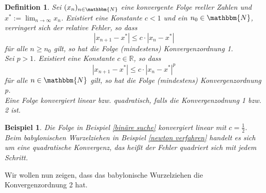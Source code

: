 \documentclass[12pt]{article}
\newcommand{\N}{\mathbbm{N}} %
\newcommand{\R}{\mathbb{R}} %
\newtheorem{definition}[satz]{Definition}
\newtheorem{beispiel}[satz]{Beispiel}
\begin{document}
\begin{definition}
    Sei $(x_n)_{n \in \N}$ eine konvergente Folge reeller Zahlen und $x^*:= \lim_{n \to \infty}x_n$. Existiert eine Konstante $c<1$ und ein $n_0 \in \N$, verringert sich der relative Fehler, so dass 
    \begin{equation*}
        |x_{n+1}-x^*| \leq c \cdot |x_n -x^*|
    \end{equation*}
    für alle $n \geq n_0$ gilt, so hat die Folge (mindestens) Konvergenzordnung 1. \\
    Sei $p>1$. Existiert eine Konstante $c \in \R$, so dass
    \begin{equation*}
        |x_{n+1}-x^*| \leq c \cdot |x_n-x^*|^p
    \end{equation*}
    für alle $n \in \N$ gilt, so hat die Folge (mindestens) Konvergenzordnung p. \\
    Eine Folge konvergiert linear bzw. quadratisch, falls die Konvergenzodnung 1 bzw. 2 ist.
\end{definition}

\begin{beispiel}
    Die Folge in Beispiel \ref{binäre suche} konvergiert linear mit $c=\frac{1}{2}$. \\
    Beim babylonischen Wurzelziehen in Beispiel \ref{newton verfahren} handelt es sich um eine quadratische Konvergenz, das heißt der Fehler quadriert sich mit jedem Schritt.
\end{beispiel}

\noindent Wir wollen nun zeigen, dass das babylonische Wurzelziehen die Konvergenzordnung 2 hat. 
\end{document}
